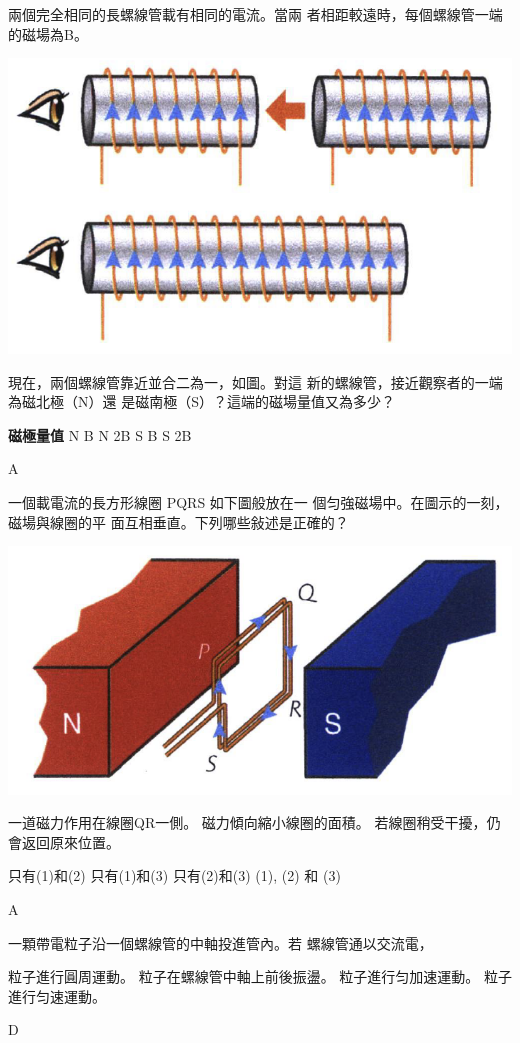 {
    兩個完全相同的長螺線管載有相同的電流。當兩 者相距較遠時，每個螺線管一端的磁場為B。
    \par{\par\centering\includegraphics[width=.35\textwidth]{./img/ch4_magnetostatics_mc_2024-06-23-21-00-53.png}\par}
    現在，兩個螺線管靠近並合二為一，如圖。對這 新的螺線管，接近觀察者的一端為磁北極（N）還 是磁南極（S）？這端的磁場量值又為多少？
    \begin{tasks}
        \task \textbf{磁極}\tab \tab \textbf{量值}
        \task N \tab \tab B
        \task N \tab \tab 2B
        \task S \tab \tab B
        \task S \tab \tab 2B
    \end{tasks}

}{A}

{
    一個載電流的長方形線圈 PQRS 如下圖般放在一 個匀強磁場中。在圖示的一刻，磁場與線圈的平 面互相垂直。下列哪些敍述是正確的？
    \par{\par\centering\includegraphics[width=.35\textwidth]{./img/ch4_magnetostatics_mc_2024-06-23-21-02-39.png}\par}
    \begin{statements}
        \task 一道磁力作用在線圈QR一側。
        \task 磁力傾向縮小線圈的面積。
        \task 若線圈稍受干擾，仍會返回原來位置。
    \end{statements}
    \begin{tasks}
        \task 只有(1)和(2)
        \task 只有(1)和(3)
        \task 只有(2)和(3)
        \task (1), (2) 和 (3)
    \end{tasks}
}{A}

{
    一顆帶電粒子沿一個螺線管的中軸投進管內。若 螺線管通以交流電，
    \begin{tasks}
        \task 粒子進行圓周運動。
        \task 粒子在螺線管中軸上前後振盪。
        \task 粒子進行匀加速運動。
        \task 粒子進行匀速運動。
    \end{tasks}
}{D}

